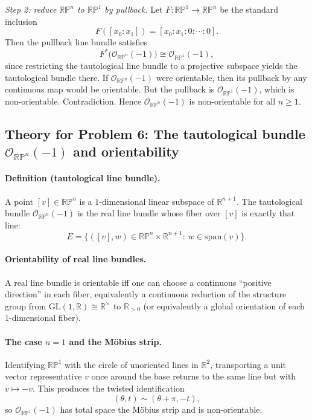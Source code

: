 \documentclass[12pt,a4paper]{article}
\theoremstyle{plain}
\theoremstyle{definition}      %
\begin{document}
	\smallskip
	\textit{Step 2: reduce $\mathbb{RP}^n$ to $\mathbb{RP}^1$ by pullback.}
	Let $F:\mathbb{RP}^1\to\mathbb{RP}^n$ be the standard inclusion
	\[
	F([x_0:x_1])=[x_0:x_1:0:\cdots:0].
	\]
	Then the pullback line bundle satisfies
	\[
	F^*\big(\mathcal{O}_{\mathbb{RP}^n}(-1)\big)\cong \mathcal{O}_{\mathbb{RP}^1}(-1),
	\]
	since restricting the tautological line bundle to a projective subspace yields the tautological bundle there.
	If $\mathcal{O}_{\mathbb{RP}^n}(-1)$ were orientable, then its pullback by any continuous map would be orientable.
	But the pullback is $\mathcal{O}_{\mathbb{RP}^1}(-1)$, which is non-orientable. Contradiction.
	Hence $\mathcal{O}_{\mathbb{RP}^n}(-1)$ is non-orientable for all $n\ge 1$.
	

	
	
	
	\subsection*{Theory for Problem 6: The tautological bundle $\mathcal{O}_{\mathbb{RP}^n}(-1)$ and orientability}
	
	\paragraph{Definition (tautological line bundle).}
	A point $[v]\in\mathbb{RP}^n$ is a $1$-dimensional linear subspace of $\mathbb{R}^{n+1}$.
	The tautological bundle $\mathcal{O}_{\mathbb{RP}^n}(-1)$ is the real line bundle
	whose fiber over $[v]$ is exactly that line:
	\[
	E=\{([v],w)\in \mathbb{RP}^n\times \mathbb{R}^{n+1}:\ w\in \mathrm{span}(v)\}.
	\]
	
	\paragraph{Orientability of real line bundles.}
	A real line bundle is orientable iff one can choose a continuous ``positive direction'' in each fiber,
	equivalently a continuous reduction of the structure group from $\mathrm{GL}(1,\mathbb{R})\cong\mathbb{R}^\times$
	to $\mathbb{R}_{>0}$ (or equivalently a global orientation of each $1$-dimensional fiber).
	
	\paragraph{The case $n=1$ and the M\"obius strip.}
	Identifying $\mathbb{RP}^1$ with the circle of unoriented lines in $\mathbb{R}^2$,
	transporting a unit vector representative $v$ once around the base returns to the same line but with $v\mapsto -v$.
	This produces the twisted identification
	\[
	(\theta,t)\sim(\theta+\pi,-t),
	\]
	so $\mathcal{O}_{\mathbb{RP}^1}(-1)$ has total space the M\"obius strip and is non-orientable.
	
\end{document}
